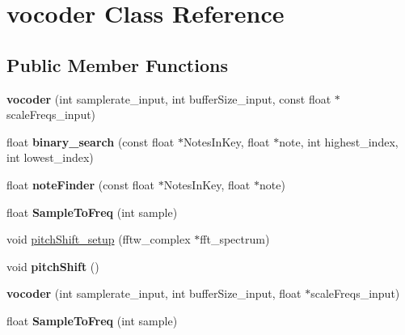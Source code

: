 \hypertarget{classvocoder}{\section{vocoder Class Reference}
\label{classvocoder}
}
\subsection*{Public Member Functions}
\begin{DoxyCompactItemize}
\item 
\hypertarget{classvocoder_a5e51f2bff73fdb41cb326e0743170b15}{{\bfseries vocoder} (int samplerate\-\_\-input, int buffer\-Size\-\_\-input, const float $\ast$scale\-Freqs\-\_\-input)}\label{classvocoder_a5e51f2bff73fdb41cb326e0743170b15}

\item 
\hypertarget{classvocoder_a516a5e099509664b6b328a9d055adcd7}{float {\bfseries binary\-\_\-search} (const float $\ast$Notes\-In\-Key, float $\ast$note, int highest\-\_\-index, int lowest\-\_\-index)}\label{classvocoder_a516a5e099509664b6b328a9d055adcd7}

\item 
\hypertarget{classvocoder_ac1c52677bdf6c7233f667c3905539716}{float {\bfseries note\-Finder} (const float $\ast$Notes\-In\-Key, float $\ast$note)}\label{classvocoder_ac1c52677bdf6c7233f667c3905539716}

\item 
\hypertarget{classvocoder_a2b3a6e386d3a18f9366320e5743d33b1}{float {\bfseries Sample\-To\-Freq} (int sample)}\label{classvocoder_a2b3a6e386d3a18f9366320e5743d33b1}

\item 
void \hyperlink{classvocoder_aa3d122aee6d6ae77ac5b04572e924dc0}{pitch\-Shift\-\_\-setup} (fftw\-\_\-complex $\ast$fft\-\_\-spectrum)
\item 
\hypertarget{classvocoder_aa218678a51da7429066c32e59edd5057}{void {\bfseries pitch\-Shift} ()}\label{classvocoder_aa218678a51da7429066c32e59edd5057}

\item 
\hypertarget{classvocoder_ac910dd4565d340211f8806302e3834f8}{{\bfseries vocoder} (int samplerate\-\_\-input, int buffer\-Size\-\_\-input, float $\ast$scale\-Freqs\-\_\-input)}\label{classvocoder_ac910dd4565d340211f8806302e3834f8}

\item 
\hypertarget{classvocoder_a2b3a6e386d3a18f9366320e5743d33b1}{float {\bfseries Sample\-To\-Freq} (int sample)}\label{classvocoder_a2b3a6e386d3a18f9366320e5743d33b1}


\end{DoxyCompactItemize}
